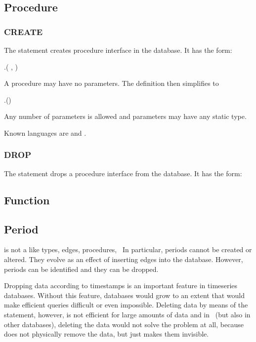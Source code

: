  

\subsection{Procedure}
\subsubsection{CREATE}
The  statement
creates procedure interface in the database.
It has the form:

 .(
                            ,
                            )
                            

A procedure may have no parameters.
The definition then simplifies to

 .()
                            

Any number of parameters is allowed and parameters may have
any static type.

Known languages are  and .

\subsubsection{DROP}
The  statement
drops a procedure interface from the database.
It has the form:

 

\subsection{Function}

\subsection{Period}
 is not a 
like types, edges, procedures, \etc\
In particular, periods cannot be created or altered.
They evolve as an effect of inserting edges into
the database. However, periods can be identified
and they can be dropped.

Dropping data according to timestamps is an important
feature in timeseries databases.
Without this feature, databases would grow
to an extent that would make efficient queries difficult
or even impossible. Deleting data by means of the
 statement, however, is not efficient for large
amounts of data and in \nowdb\
(but also in other databases), deleting
the data would not solve the problem at all,
because \term{delete} does not physically remove
the data, but just makes them invisible.

